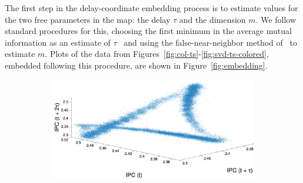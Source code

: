 The first step in the delay-coordinate embedding process is to
estimate values for the two free parameters in the map: the delay
$\tau$ and the dimension $m$.  We follow standard procedures for this,
choosing the first minimum in the average mutual information as an
estimate of $\tau$~\cite{fraser-swinney} and using the
false-near-neighbor method of~\cite{KBA92} to estimate $m$.  Plots of
the data from Figures~\ref{fig:col-ts}-\ref{fig:svd-ts-colored},
embedded following this procedure, are shown in
Figure~\ref{fig:embedding}.
 \begin{figure}
   \centering
\begin{subfigure}{\columnwidth}
    \includegraphics[width=\columnwidth]{figs/colipc3d.png}
    \caption{\col }
    \label{fig:colEmbedding}
  \end{subfigure}%
  

\end{figure}
